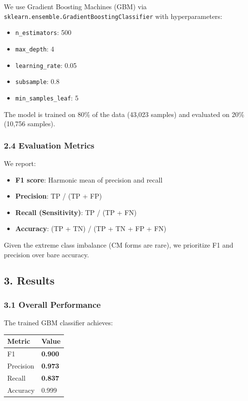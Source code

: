 \documentclass[
]{article}
\providecommand{\tightlist}{%
  \setlength{\itemsep}{0pt}\setlength{\parskip}{0pt}}
\begin{document}
We use Gradient Boosting Machines (GBM) via
\texttt{sklearn.ensemble.GradientBoostingClassifier} with
hyperparameters:

\begin{itemize}
\tightlist
\item
  \texttt{n\_estimators}: 500
\item
  \texttt{max\_depth}: 4
\item
  \texttt{learning\_rate}: 0.05
\item
  \texttt{subsample}: 0.8
\item
  \texttt{min\_samples\_leaf}: 5
\end{itemize}

The model is trained on 80\% of the data (43,023 samples) and evaluated
on 20\% (10,756 samples).

\hypertarget{evaluation-metrics}{%
\subsubsection{2.4 Evaluation Metrics}\label{evaluation-metrics}}

We report:

\begin{itemize}
\tightlist
\item
  \textbf{F1 score}: Harmonic mean of precision and recall
\item
  \textbf{Precision}: TP / (TP + FP)
\item
  \textbf{Recall (Sensitivity)}: TP / (TP + FN)
\item
  \textbf{Accuracy}: (TP + TN) / (TP + TN + FP + FN)
\end{itemize}

Given the extreme class imbalance (CM forms are rare), we prioritize F1
and precision over bare accuracy.

\hypertarget{results}{%
\subsection{3. Results}\label{results}}

\hypertarget{overall-performance}{%
\subsubsection{3.1 Overall Performance}\label{overall-performance}}

The trained GBM classifier achieves:

\begin{longtable}[]{@{}ll@{}}
\toprule\noalign{}
Metric & Value \\
\midrule\noalign{}
\endhead
\bottomrule\noalign{}
\endlastfoot
F1 & \textbf{0.900} \\
Precision & \textbf{0.973} \\
Recall & \textbf{0.837} \\
Accuracy & 0.999 \\
\end{longtable}
\end{document}
